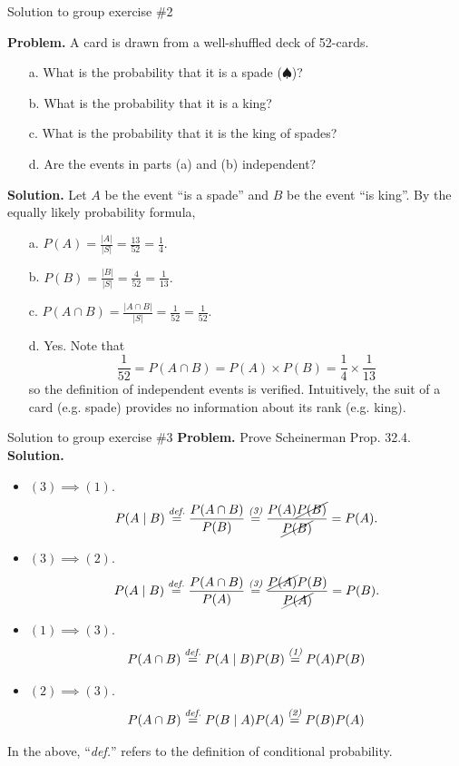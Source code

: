 \documentclass[10pt]{beamer}
\begin{document}
\begin{frame}{Solution to group exercise \#2}


\textbf{Problem.} A card is drawn from a well-shuffled deck of 52-cards.
	\begin{itemize}
	\item[a.] What is the probability that it is a spade ($\spadesuit$)?
	\item[b.] What is the probability that it is a king?	
	\item[c.] What is the probability that it is the king of spades?
	\item[d.] Are the events in parts (a) and (b) independent?
	\end{itemize}
\vfill 
\textbf{Solution.} Let $A$ be the event \enquote{is a spade} and $B$ be the event \enquote{is king}. By the equally likely probability formula,
	\begin{itemize}
	\item[a.] $P(A) = \frac{|A|}{|S|} = \frac{13}{52} = \frac{1}{4}.$
	\item[b.] $P(B) = \frac{|B|}{|S|} = \frac{4}{52} = \frac{1}{13}.$	
	\item[c.] $P(A \cap B) = \frac{|A \cap B|}{|S|} = \frac{1}{52} = \frac{1}{52}.$	
	\item[d.] Yes. Note that 
	\[ \frac{1}{52} = P(A \cap B) =P(A) \times P(B) = \frac{1}{4} \times \frac{1}{13} \]
	so the definition of independent events is verified.  Intuitively, the suit of a card (e.g. spade) provides no information about its rank (e.g. king). 
	\end{itemize}

\end{frame}


\begin{frame}{Solution to group exercise \#3}
\small 
\textbf{Problem.} Prove Scheinerman Prop. 32.4.
\vfill 
\textbf{Solution.} 
\begin{itemize}
\item $\boxed{(3) \implies (1).}$
\[ P(A \; | \; B) \stackrel{\textit{def.}}{{=}}	 \frac{P(A \cap B)}{P(B)} \stackrel{\textit{(3)}}{{=}}	   \frac{P(A) \cancel{P(B)}}{\cancel{P(B)}} = P(A).  \]
\item $\boxed{(3) \implies (2).}$
\[ P(A \; | \; B) \stackrel{\textit{def.}}{{=}}	 \frac{P(A \cap B)}{P(A)} \stackrel{\textit{(3)}}{{=}}	   \frac{ \cancel{P(A)} P(B)}{\cancel{P(A)}} = P(B).  \]
\item $\boxed{(1) \implies (3).}$
\[ P(A \cap B) \stackrel{\textit{def.}}{{=}}	  P(A \; | \; B) P(B) \stackrel{\textit{(1)}}{{=}}	P(A) P(B) \]
\item $\boxed{(2) \implies (3).}$
\[ P(A \cap B) \stackrel{\textit{def.}}{{=}}	  P(B \; | \; A) P(A) \stackrel{\textit{(2)}}{{=}}	P(B) P(A) \]
\end{itemize}
In the above, \enquote{\textit{def.}} refers to the definition of conditional probability.
\end{frame}
\end{document}
